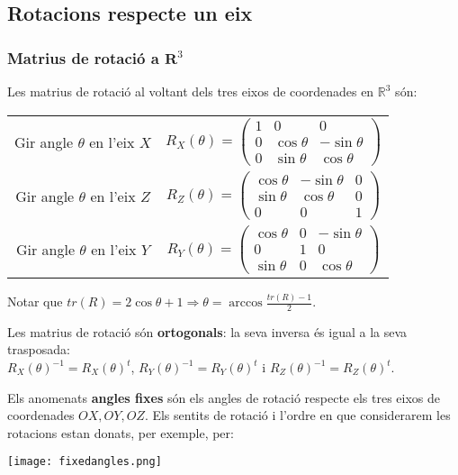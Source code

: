 \documentclass{beamer}
\begin{document}
\subsection{Rotacions respecte un eix}
\begin{frame}[allowframebreaks]
  \frametitle{Matrius de rotació a $\mathbf{R}^3$}
  Les matrius de rotació al voltant dels tres eixos de coordenades en $\mathbb{R}^3$ són:
  \begin{center}
  \begin{tabular}{cc}
    Gir angle $\theta$ en l'eix $X$ &
    $R_X(\theta) =
      \begin{pmatrix}
        1&0&0\\
        0&\cos{\theta}&-\sin{\theta}\\
        0&\sin{\theta}&\cos{\theta}
      \end{pmatrix}$\\
    Gir angle $\theta$ en l'eix $Z$ &
    $R_Z(\theta) =
      \begin{pmatrix}
        \cos{\theta}&-\sin{\theta}&0\\
        \sin{\theta}&\cos{\theta}&0\\
        0&0&1
      \end{pmatrix}$\\
    Gir angle $\theta$ en l'eix $Y$ &
    $R_Y(\theta) =
      \begin{pmatrix}
        \cos{\theta}&0&-\sin{\theta}\\
        0&1&0\\
        \sin{\theta}&0&\cos{\theta}
      \end{pmatrix}$\\
  \end{tabular}
\end{center}
  Notar que $tr(R)=2\cos{\theta}+1 \Rightarrow \theta = \arccos{\frac{tr(R)-1}{2}}$.

  \framebreak
  
  Les matrius de rotació són {\bf ortogonals}: la seva inversa és igual a la seva trasposada:\\ $R_X(\theta)^{-1}=R_X(\theta)^t$, $R_Y(\theta)^{-1}=R_Y(\theta)^t$ i $R_Z(\theta)^{-1}=R_Z(\theta)^t$.

  Els anomenats {\bf angles fixes} són els angles de rotació respecte els tres eixos de coordenades $OX, OY, OZ$. Els sentits de rotació i l'ordre en que considerarem les rotacions estan donats, per exemple, per:\cite{vanverth}
  \begin{center}
    \texttt{[image: fixedangles.png]}
  \end{center}


\end{frame}
\end{document}
